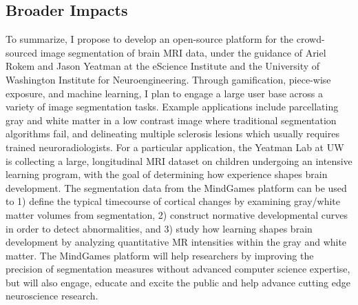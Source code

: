 \subsection*{Broader Impacts}

To summarize, I propose to develop an open-source platform for the crowd-sourced image segmentation of brain MRI data, under the guidance of Ariel Rokem and Jason Yeatman at the eScience Institute and the University of Washington Institute for Neuroengineering. Through gamification, piece-wise exposure, and machine learning, I plan to engage a large user base across a variety of image segmentation tasks. Example applications include parcellating gray and white matter in a low contrast image where traditional segmentation algorithms fail, and delineating multiple sclerosis lesions which usually requires trained neuroradiologists. For a particular application, the Yeatman Lab at UW is collecting a large, longitudinal MRI  dataset on children undergoing an intensive learning program, with the goal of determining how experience shapes brain development. The segmentation data from the MindGames platform can be used to 1) define the typical timecourse of cortical changes by examining gray/white matter volumes from segmentation, 2) construct normative developmental curves in order to detect abnormalities, and 3) study how learning shapes brain development by analyzing quantitative MR intensities within the gray and white matter. The MindGames platform will help researchers by improving the precision of segmentation measures without advanced computer science expertise, but will also engage, educate and excite the public and help advance cutting edge neuroscience research. 

